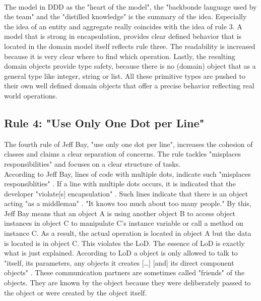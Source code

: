 \\
The model in \ac{DDD} as the "heart of the model", the "backbonde language used by the team" and the "distilled knowledge" \cite[p. 25]{dddbook} is the summary of the idea. Especially the idea of an entity and aggregate really coincides with the idea of rule 3. A model that is strong in encapsulation, provides clear defined behavior that is located in the domain model itself reflects rule three. The readability is increased because it is very clear where to find which operation. Lastly, the resulting domain objects provide type safety, because there is no (domain) object that as a general type like integer, string or list. All these primitive types are pushed to their own well defined domain objects that offer a precise behavior reflecting real world operations. 



\subsection*{Rule 4: "Use Only One Dot per Line"}
The fourth rule of Jeff Bay, "use only one dot per line", increases the cohesion of classes and claims a clear separation of concerns. The rule tackles "misplaces responsibilities" \cite{oc2008} and focuses on a clear structure of tasks.\\

According to Jeff Bay, lines of code with multiple dots, indicate such "misplaces responsiblities" \cite{oc2008}. If a line with multiple dots occurs, it is indicated that the developer "violate[s] encapsulation" \cite{oc2008}. Such lines indicate that there is an object acting "as a middleman" \cite{oc2008}. "It knows too much about too many people." \cite{oc2008} By this, Jeff Bay means that an object A is using another object B to access object instances in object C to manipulate C's instance variable or call a method on instance C. As a result, the actual operation is located in object A but the data is located is in object C. This violates the \ac{LoD}. The essence of \ac{LoD} is exactly what is just explained. According to \ac{LoD} a object is only allowed to talk to "itself, its parameters, any objects it creates [\dots] [and] its direct component objects" \cite{ba.com}. These communication partners are sometimes called "friends" of the objects. They are known by the object because they were deliberately passed to the object or were created by the object itself.  
\\

